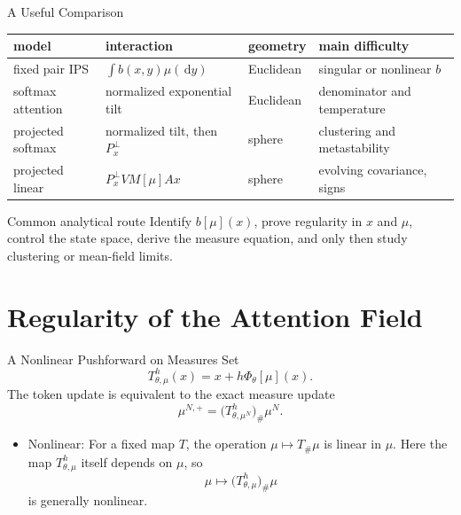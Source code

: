 \documentclass[aspectratio=169,11pt]{beamer}
\newcommand{\dd}{\,\mathrm{d}}
\begin{document}
\begin{frame}{A Useful Comparison}
\begin{center}
\scriptsize
\begin{tabular}{@{}p{}|p{}|p{}|p{}@{}}
model & interaction & geometry & main difficulty \\
\hline
fixed pair IPS & $\int b(x,y)\mu(\dd y)$ & Euclidean & singular or nonlinear $b$ \\
softmax attention & normalized exponential tilt & Euclidean & denominator and temperature \\
projected softmax & normalized tilt, then $P_x^\perp$ & sphere & clustering and metastability \\
projected linear & $P_x^\perp V M[\mu]Ax$ & sphere & evolving covariance, signs
\end{tabular}
\end{center}

\begin{block}{Common analytical route}
Identify $b[\mu](x)$, prove regularity in $x$ and $\mu$, control the state space, derive the measure equation, and only then study clustering or mean-field limits.
\end{block}
\end{frame}



\section{Regularity of the Attention Field}


\begin{frame}{A Nonlinear Pushforward on Measures}
Set
\[
 T_{\theta,\mu}^h(x)=x+h\Phi_\theta[\mu](x).
\]
The token update is equivalent to the exact measure update
\[
 \boxed{
 \mu^{N,+}=\bigl(T_{\theta,\mu^N}^h\bigr)_\#\mu^N.}
\]

\begin{itemize}
  \item Nonlinear: 
For a fixed map $T$, the operation $\mu\mapsto T_\#\mu$ is linear in $\mu$.
Here the map $T_{\theta,\mu}^h$ itself depends on $\mu$, so
\[
 \mu\longmapsto\bigl(T_{\theta,\mu}^h\bigr)_\#\mu
\]
is generally nonlinear.
\end{itemize}
\end{frame}
\end{document}
